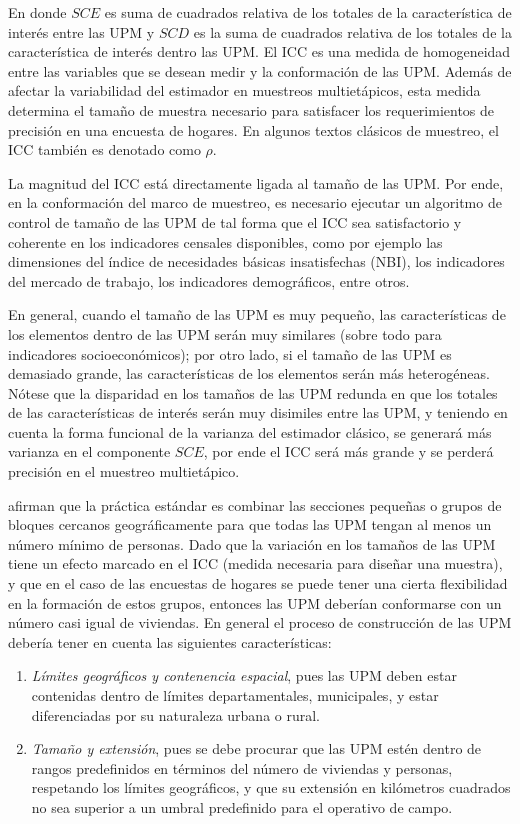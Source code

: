 \documentclass[
  12pt,
]{book}
\providecommand{\tightlist}{%
  \setlength{\itemsep}{0pt}\setlength{\parskip}{0pt}}
\begin{document}
En donde \(SCE\) es suma de cuadrados relativa de los totales de la característica de interés entre las UPM y \(SCD\) es la suma de cuadrados relativa de los totales de la característica de interés dentro las UPM. El ICC es una medida de homogeneidad entre las variables que se desean medir y la conformación de las UPM. Además de afectar la variabilidad del estimador en muestreos multietápicos, esta medida determina el tamaño de muestra necesario para satisfacer los requerimientos de precisión en una encuesta de hogares. En algunos textos clásicos de muestreo, el ICC también es denotado como \(\rho\).

La magnitud del ICC está directamente ligada al tamaño de las UPM. Por ende, en la conformación del marco de muestreo, es necesario ejecutar un algoritmo de control de tamaño de las UPM de tal forma que el ICC sea satisfactorio y coherente en los indicadores censales disponibles, como por ejemplo las dimensiones del índice de necesidades básicas insatisfechas (NBI), los indicadores del mercado de trabajo, los indicadores demográficos, entre otros.

En general, cuando el tamaño de las UPM es muy pequeño, las características de los elementos dentro de las UPM serán muy similares (sobre todo para indicadores socioeconómicos); por otro lado, si el tamaño de las UPM es demasiado grande, las características de los elementos serán más heterogéneas. Nótese que la disparidad en los tamaños de las UPM redunda en que los totales de las características de interés serán muy disimiles entre las UPM, y teniendo en cuenta la forma funcional de la varianza del estimador clásico, se generará más varianza en el componente \(SCE\), por ende el ICC será más grande y se perderá precisión en el muestreo multietápico.

\citet{Valliant_Dever_Kreuter_2013} afirman que la práctica estándar es combinar las secciones pequeñas o grupos de bloques cercanos geográficamente para que todas las UPM tengan al menos un número mínimo de personas. Dado que la variación en los tamaños de las UPM tiene un efecto marcado en el ICC (medida necesaria para diseñar una muestra), y que en el caso de las encuestas de hogares se puede tener una cierta flexibilidad en la formación de estos grupos, entonces las UPM deberían conformarse con un número casi igual de viviendas. En general el proceso de construcción de las UPM debería tener en cuenta las siguientes características:

\begin{enumerate}
\def\labelenumi{\arabic{enumi}.}
\tightlist
\item
  \emph{Límites geográficos y contenencia espacial}, pues las UPM deben estar contenidas dentro de límites departamentales, municipales, y estar diferenciadas por su naturaleza urbana o rural.
\item
  \emph{Tamaño y extensión}, pues se debe procurar que las UPM estén dentro de rangos predefinidos en términos del número de viviendas y personas, respetando los límites geográficos, y que su extensión en kilómetros cuadrados no sea superior a un umbral predefinido para el operativo de campo.
\end{enumerate}
\end{document}
